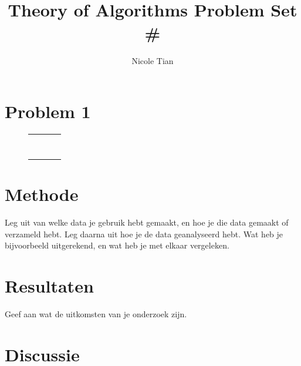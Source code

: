 \documentclass[12pt]{article}
\title{Theory of Algorithms Problem Set \#}
\author{Nicole Tian}
\begin{document}
\maketitle                  %
\thispagestyle{empty}       %

\section*{Problem 1}
\begin{figure}[H]
\centering
\begin{tabular}{c l c l}
\toprule
 &  &  & \\
\midrule
 &  &  & \\
 &  &  & \\
 &  &  & \\
 &  &  & \\
 &  &  & \\
 &  &  & \\
 &  &  & \\
 &  &  & \\
\bottomrule
\end{tabular}
\end{figure}



\section*{Methode}

Leg uit van welke data je gebruik hebt gemaakt, en hoe je die data gemaakt of verzameld hebt. Leg daarna uit hoe je de data geanalyseerd hebt. Wat heb je bijvoorbeeld uitgerekend, en wat heb je met elkaar vergeleken.

\section*{Resultaten }

Geef aan wat de uitkomsten van je onderzoek zijn.

\section*{Discussie}
\end{document}
